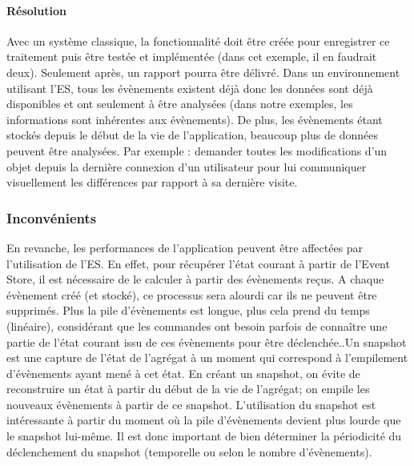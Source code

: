 \paragraph{Résolution} Avec un système classique, la fonctionnalité doit être 
créée pour enregistrer ce traitement puis être testée et implémentée (dans cet 
exemple, il en faudrait deux). Seulement après, un rapport pourra être délivré. 
Dans un environnement utilisant l'\gls{ES}, tous les évènements existent déjà 
donc les données sont déjà disponibles et ont seulement à être analysées 
(dans 
notre exemples, les informations sont inhérentes aux évènements). De plus, les 
évènements étant stockés depuis le début de la vie de l'application, beaucoup plus de données peuvent être analysées. Par 
exemple : demander toutes les modifications d'un objet depuis la dernière 
connexion d'un utilisateur pour lui communiquer visuellement les différences par 
rapport à sa dernière visite.



\subsubsection{Inconvénients}
En revanche, les performances de l'application peuvent être affectées par 
l'utilisation de 
l'\gls{ES}. En effet, pour récupérer l'état courant à partir de l'Event Store, il est 
nécessaire de le calculer à partir des évènements reçus.
A chaque évènement créé (et stocké), ce processus sera alourdi car ils ne 
peuvent être supprimés. Plus la pile d'évènements est longue, plus cela prend 
du temps (linéaire), considérant que les commandes ont besoin parfois de connaître une partie de l'état courant issu de ces évènements pour être déclenchée..Un \gls{snapshot} est une capture de l'état de l'agrégat à un 
moment qui correspond à l'empilement d'évènements ayant mené à cet état. En 
créant un \gls{snapshot}, on évite de reconstruire un état à partir du début de la 
vie de l'agrégat; on empile les nouveaux évènements à partir de ce snapshot. 
L'utilisation du \gls{snapshot} est intéressante à partir du moment où la pile 
d'évènements devient plus lourde que le \gls{snapshot} lui-même. Il est donc 
important de bien déterminer la périodicité du déclenchement du \gls{snapshot} 
(temporelle ou selon le nombre d'évènements).

